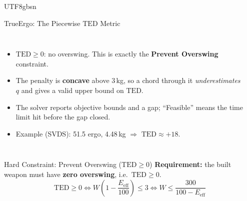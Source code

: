 \documentclass[aspectratio=169]{beamer}
\begin{document}
\begin{CJK*}{UTF8}{gbsn}
\begin{frame}{TrueErgo: The Piecewise $\text{TED}$ Metric}
    \vspace{-0.4cm}
    \begin{columns}
        \begin{itemize}\footnotesize
            \item $\text{TED} \ge 0$: no overswing. This is exactly the \textbf{Prevent Overswing} constraint.
            \item The penalty is \textbf{concave} above 3\,kg, so a chord through it \emph{underestimates} $q$ and gives a valid upper bound on $\text{TED}$.
            \item The solver reports objective bounds and a gap; ``Feasible'' means the time limit hit before the gap closed.
            \item Example (SVDS): 51.5 ergo, 4.48\,kg $\Rightarrow$ $\text{TED} \approx +18$.
        \end{itemize}

        \begin{center}
        \end{center}
    \end{columns}
\end{frame}

\begin{frame}{Hard Constraint: Prevent Overswing ($\text{TED} \ge 0$)}
    \textbf{Requirement:} the built weapon must have \textbf{zero overswing}, i.e.\ $\text{TED} \ge 0$.
    \[
    \text{TED} \ge 0 \iff W\left(1 - \frac{E_{\text{eff}}}{100}\right) \le 3 \iff W \le \frac{300}{100 - E_{\text{eff}}}
    \]

    \vspace{-0.1cm}
    \begin{columns}
        \begin{center}
\end{center}
\end{columns}
\end{frame}
\end{CJK*}
\end{document}
